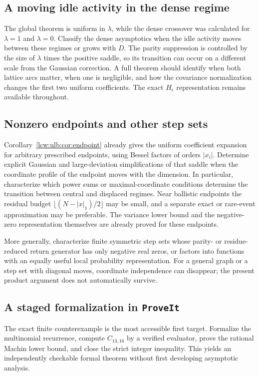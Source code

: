 \documentclass[11pt,letterpaper]{article}
\theoremstyle{remark}\newtheorem{remark}[theorem]{Remark}
\newcommand{\repo}{\texttt{ProveIt}}
\begin{document}
\subsection{A moving idle activity in the dense regime}

The global theorem is uniform in $\lambda$, while the dense crossover
was calculated for $\lambda=1$ and $\lambda=0$. Classify the dense
asymptotics when the idle activity moves between these regimes or
grows with $D$. The parity suppression is controlled by the size of
$\lambda$ times the positive saddle, so its transition can occur
on a different scale from the Gaussian correction. A full theorem
should identify when both lattice arcs matter, when one is negligible,
and how the covariance normalization changes the first two uniform
coefficients. The exact $H_\epsilon$ representation remains available
throughout.

\subsection{Nonzero endpoints and other step sets}

Corollary~\ref{lcw:ulb:cor:endpoint} already gives the uniform coefficient
expansion for arbitrary prescribed endpoints, using Bessel factors of
orders $|x_i|$. Determine explicit Gaussian and large-deviation
simplifications of that saddle when the coordinate profile of the
endpoint moves with the dimension. In particular, characterize which
power sums or maximal-coordinate conditions determine the transition
between central and displaced regimes. Near ballistic endpoints the
residual budget $\lfloor(N-|x|_1)/2\rfloor$ may be small, and a
separate exact or rare-event approximation may be preferable. The
variance lower bound and the negative-zero representation themselves
are already proved for these endpoints.

More generally, characterize finite symmetric step sets whose
parity- or residue-reduced return generator has only negative real
zeros, or factors into functions with an equally useful local
probability representation. For a general graph or a step set with
diagonal moves, coordinate independence can disappear; the present
product argument does not automatically survive.

\subsection{A staged formalization in \repo}

The exact finite counterexample is the most accessible first target.
Formalize the multinomial recurrence, compute $C_{13,16}$ by a
verified evaluator, prove the rational Machin lower bound, and close
the strict integer inequality. This yields an independently checkable
formal theorem without first developing asymptotic analysis.
\end{document}

